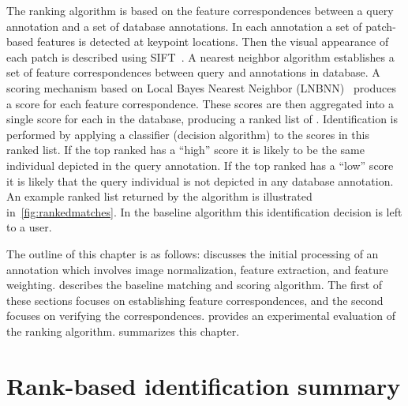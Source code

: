     The ranking algorithm is based on the feature correspondences between a
      query annotation and a set of database annotations.
    In each annotation a set of patch-based features is detected at keypoint
      locations.
    Then the visual appearance of each patch is described using
      SIFT~\cite{lowe_distinctive_2004}.
    A nearest neighbor algorithm establishes a set of feature correspondences
      between query and annotations in database.
    A scoring mechanism based on Local \Naive{} Bayes Nearest Neighbor
      (LNBNN)~\cite{mccann_local_2012} produces a score for each feature
      correspondence.
    These scores are then aggregated into a single score for each \name{} in
      the database, producing a ranked list of \names{}.
    Identification is performed by applying a classifier (decision algorithm)
      to the scores in this ranked list.
    If the top ranked \name{} has a ``high'' score it is likely to be the same
      individual depicted in the query annotation.
    If the top ranked \name{} has a ``low'' score it is likely that the query
      individual is not depicted in any database annotation.
    An example ranked list returned by the algorithm is illustrated
      in~\cref{fig:rankedmatches}.
    In the baseline algorithm this identification decision is left to a user.

    The outline of this chapter is as follows:
     discusses the initial processing of an annotation
      which involves image normalization, feature extraction, and feature
      weighting.
     describes the baseline matching and
      scoring algorithm.
    The first of these sections focuses on establishing feature
      correspondences, and the second focuses on verifying the correspondences.
     provides an experimental evaluation of the ranking
      algorithm.
     summarizes this chapter.

    \rankedmatches{}




\section{Rank-based identification summary}\label{sec:staticsum}

